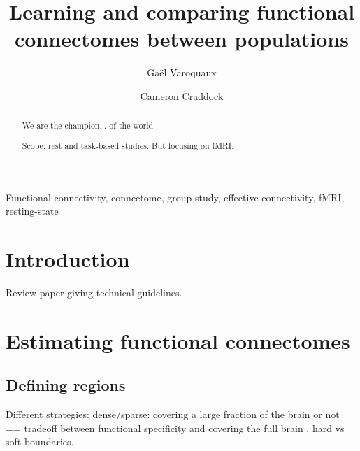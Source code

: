 \documentclass[5p]{elsarticle}
\begin{document}
\title{Learning and comparing functional connectomes between populations}


\author[parietal,unicog,cea]{Ga\"el Varoquaux}
\author[child_institute]{Cameron Craddock}


\address[parietal]{Parietal project-team, INRIA Saclay-\^ile de France}
\address[unicog]{INSERM, U992}
\address[cea]{CEA/Neurospin b\^at 145, 91191 Gif-Sur-Yvette}
\address[child_institute]{Child Institute, New York}

\begin{abstract}
    We are the champion... of the world

    Scope: rest and task-based studies. But focusing on fMRI.
\end{abstract}

\begin{keyword}
    Functional connectivity, connectome, group study, effective
    connectivity, fMRI, resting-state
\end{keyword}

\maketitle

\sloppy %
\section{Introduction}

Review paper giving technical guidelines.


\section{Estimating functional connectomes}

\subsection{Defining regions}

Different strategies: 
dense/sparse: covering a large fraction of the
brain or not == tradeoff between functional specificity and covering the
full brain
, hard vs soft boundaries.
\end{document}
